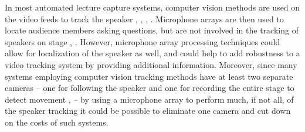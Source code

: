 \documentclass{uiucecethesis09}
\begin{document}
    In most automated lecture capture systems, computer vision methods are used 
    on the video feeds to track the speaker \cite{Bianchi:AVP},
    \cite{Zhang05anautomated}, \cite{chou:2010}, \cite{Liu:2001}. Microphone arrays
    are then used to locate audience members asking questions, but are not involved
    in the tracking of speakers on stage \cite{Liu:2001}, \cite{Zhang05anautomated}.
    However, microphone array processing techniques could allow for localization of
    the speaker as well, and could help to add robustness to a video tracking system
    by providing additional information.  Moreover, since many systems employing
    computer vision tracking methods have at least two separate cameras -- one for
    following the speaker and one for recording the entire stage to detect movement
    \cite{Bianchi:AVP}, \cite{Liu:2001} -- by using a microphone array to perform
    much, if not all, of the speaker tracking it could be possible to eliminate one
    camera and cut down on the costs of such systems.
\end{document}
